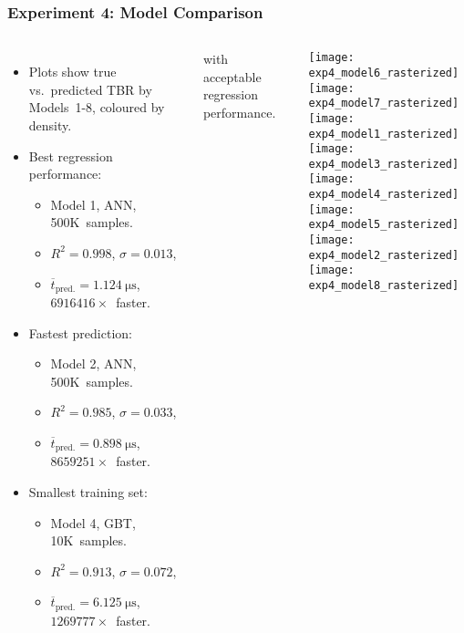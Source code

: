 \begin{frame}
	\frametitle{Experiment 4: Model Comparison}
	\begin{columns}
		\begin{itemize}
			\item
				Plots show true vs.~predicted TBR by Models~1-8,
				coloured by density.
			\item
				Best regression performance:
				\begin{itemize}
					\item
						Model 1, ANN, 500K~samples.
					\item
						$R^2=\num{0.998}$,
						$\sigma=\num{0.013}$,
					\item
						$\overline{t}_{\text{pred.}}=\SI{1.124}{\micro\second}$,
						$\num{6916416} \times$~faster.
				\end{itemize}
			\item
				Fastest prediction:\textsuperscript{\textdagger}
				\begin{itemize}
					\item
						Model 2, ANN, 500K~samples.
					\item
						$R^2=\num{0.985}$,
						$\sigma=\num{0.033}$,
					\item
						$\overline{t}_{\text{pred.}}=\SI{0.898}{\micro\second}$,
						$\num{8659251} \times$~faster.
				\end{itemize}
			\item
				Smallest training set:\textsuperscript{\textdagger}
				\begin{itemize}
					\item
						Model 4, GBT, 10K~samples.
					\item
						$R^2=\num{0.913}$,
						$\sigma=\num{0.072}$,
					\item
						$\overline{t}_{\text{pred.}}=\SI{6.125}{\micro\second}$,
						$\num{1269777} \times$~faster.
				\end{itemize}
		\end{itemize}

		{\footnotesize
			\textsuperscript{\textdagger}
			with acceptable regression performance.
		}

		\texttt{[image: exp4\_model6\_rasterized]}\hfill%
		\texttt{[image: exp4\_model7\_rasterized]}\\\vspace{-4pt}%
		\texttt{[image: exp4\_model1\_rasterized]}\hfill%
		\texttt{[image: exp4\_model3\_rasterized]}\\\vspace{-4pt}%
		\texttt{[image: exp4\_model4\_rasterized]}\hfill%
		\texttt{[image: exp4\_model5\_rasterized]}\\\vspace{-4pt}%
		\texttt{[image: exp4\_model2\_rasterized]}\hfill%
		\texttt{[image: exp4\_model8\_rasterized]}%

	\end{columns}
\end{frame}
